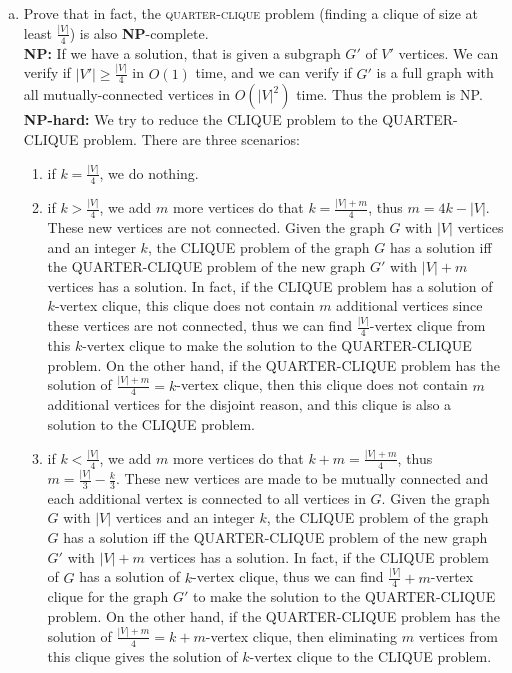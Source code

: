 \documentclass{article}\usepackage[utf8]{inputenc}\usepackage[margin=0.4cm,top=0.4cm,bottom=0.4cm]{geometry}\usepackage[usenames,dvipsnames,svgnames,table]{xcolor}
\begin{document}
\begin{enumerate}[a.]
\item Prove that in fact, the \textsc{quarter-clique} problem (finding a clique of size at least $\frac{|V|}
4$) is also \textbf{NP}-complete.
\BeginSolution %
\\
\textbf{NP: } If we have a solution, that is given a subgraph $G'$ of $V'$ vertices. We can verify if $|V'|\geq \frac{|V|}4$ in $O(1)$ time, and we can verify if $G'$ is a full graph with all mutually-connected vertices in $O(|V|^2)$ time. Thus the problem is NP.\\
\textbf{NP-hard: }We try to reduce the CLIQUE problem to the QUARTER-CLIQUE problem. There are three scenarios:
%
\begin{enumerate}[1]
	\item if $k = \frac{|V|}4$, we do nothing.
	\item if $k > \frac{|V|}4$, we add $m$ more vertices do that $k = \frac{|V| + m}4$, thus $m = 4k - |V|$. These new vertices are not connected. Given the graph $G$ with $|V|$ vertices and an integer $k$, the CLIQUE problem of the graph $G$ has a solution iff the QUARTER-CLIQUE problem of the new graph $G'$ with $|V|+m$ vertices has a solution. In fact, if the CLIQUE problem has a solution of $k$-vertex clique, this clique does not contain $m$ additional vertices since these vertices are not connected, thus we can find $\frac{|V|}{4}$-vertex clique from this $k$-vertex clique to make the solution to the QUARTER-CLIQUE problem. On the other hand, if the QUARTER-CLIQUE problem has the solution of $\frac{|V| + m}4 = k$-vertex clique, then this clique does not contain $m$ additional vertices for the disjoint reason, and this clique is also a solution to the CLIQUE problem.
	\item if $k < \frac{|V|}4$, we add $m$ more vertices do that $k + m = \frac{|V| + m}4$, thus $m = \frac{|V|}3 - \frac{k}{3}$. These new vertices are made to be mutually connected and each additional vertex is connected to all vertices in $G$. Given the graph $G$ with $|V|$ vertices and an integer $k$, the CLIQUE problem of the graph $G$ has a solution iff the QUARTER-CLIQUE problem of the new graph $G'$ with $|V|+m$ vertices has a solution. In fact, if the CLIQUE problem of $G$ has a solution of $k$-vertex clique, thus we can find $\frac{|V|}{4} + m$-vertex clique for the graph $G'$ to make the solution to the QUARTER-CLIQUE problem. On the other hand, if the QUARTER-CLIQUE problem has the solution of $\frac{|V| + m}4 = k + m$-vertex clique, then eliminating $m$ vertices from this clique gives the solution of $k$-vertex clique to the CLIQUE problem.

\end{enumerate}
\end{enumerate}
\end{document}
